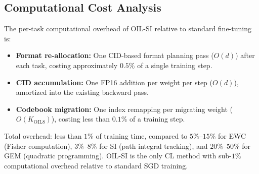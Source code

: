 \subsection{Computational Cost Analysis}

The per-task computational overhead of OIL-SI relative to standard fine-tuning is:

\begin{itemize}
    \item \textbf{Format re-allocation:} One CID-based format planning pass ($O(d)$) after each task, costing approximately $0.5\%$ of a single training step.
    \item \textbf{CID accumulation:} One FP16 addition per weight per step ($O(d)$), amortized into the existing backward pass.
    \item \textbf{Codebook migration:} One index remapping per migrating weight ($O(K_{\text{OIL8}})$), costing less than $0.1\%$ of a training step.
\end{itemize}

Total overhead: less than $1\%$ of training time, compared to $5\%$--$15\%$ for EWC (Fisher computation), $3\%$--$8\%$ for SI (path integral tracking), and $20\%$--$50\%$ for GEM (quadratic programming). OIL-SI is the only CL method with sub-$1\%$ computational overhead relative to standard SGD training.
